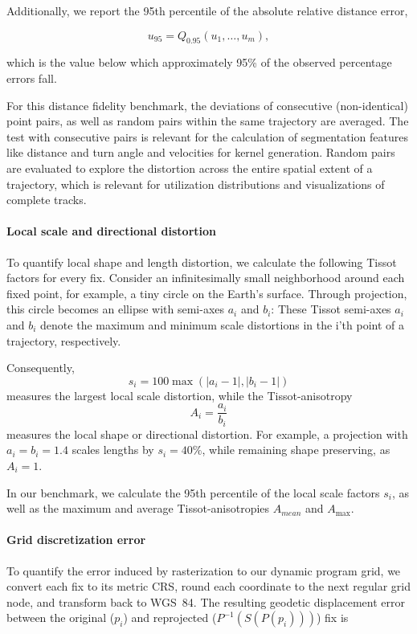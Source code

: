 Additionally, we report the 95th percentile of the absolute relative
distance error,

\[
u_{95}
=
Q_{0.95}(u_1,\ldots,u_m),
\]

which is the value below which approximately 95\% of the observed
percentage errors fall.

For this distance fidelity benchmark, the deviations of consecutive (non-identical) point pairs, as well as random pairs within the same trajectory are averaged.
The test with consecutive pairs is relevant for the calculation of segmentation features like distance and turn angle and velocities for kernel generation.
Random pairs are evaluated to explore the distortion across the entire spatial extent of a trajectory, which is relevant for utilization distributions and visualizations of complete tracks.

\paragraph{Local scale and directional distortion}
To quantify local shape and length distortion, we calculate the following Tissot factors for every fix.
Consider an infinitesimally small neighborhood around each fixed point, for example, a tiny circle on the Earth's surface.
Through projection, this circle becomes an ellipse with semi-axes \(a_i\) and \(b_i\):
These Tissot semi-axes $a_i$ and $b_i$ denote the maximum and minimum scale distortions in the i'th point of a trajectory, respectively.

Consequently,
  \[
  s_i=100\max(|a_i-1|,|b_i-1|)
  \]
measures the largest local scale distortion, while the Tissot-anisotropy
  \[
  A_i=\frac{a_i}{b_i}
  \]
measures the local shape or directional distortion.
For example, a projection with $a_i=b_i=1.4$ scales lengths by $s_i=40\%$, while remaining shape preserving, as $A_i=1$.

In our benchmark, we calculate the 95th percentile of the local scale factors $s_i$, as well as the maximum and average Tissot-anisotropies $A_{mean}$ and $A_{\max}$.

\paragraph{Grid discretization error}
To quantify the error induced by rasterization to our dynamic program grid, we convert each fix to its metric CRS,
round each coordinate to the next regular grid node, and transform back to WGS~84.
The resulting geodetic displacement error between the original ($p_i$) and reprojected ($P^{-1}\!\left(S(P(p_i))\right)$) fix is

